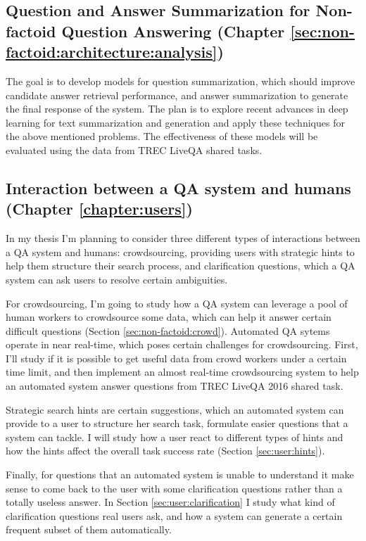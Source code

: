 \subsection{Question and Answer Summarization for Non-factoid Question Answering (Chapter \ref{sec:non-factoid:architecture:analysis})}
\label{sec:plan2}

The goal is to develop models for question summarization, which should improve candidate answer retrieval performance, and answer summarization to generate the final response of the system.
The plan is to explore recent advances in deep learning for text summarization \cite{rush-chopra-weston:2015:EMNLP,chopraabstractive16} and generation \cite{karpathy2015deep} and apply these techniques for the above mentioned problems.
The effectiveness of these models will be evaluated using the data from TREC LiveQA shared tasks.


\subsection{Interaction between a QA system and humans (Chapter \ref{chapter:users})}
\label{sec:plan4}

In my thesis I'm planning to consider three different types of interactions between a QA system and humans: crowdsourcing, providing users with strategic hints to help them structure their search process, and clarification questions, which a QA system can ask users to resolve certain ambiguities.

For crowdsourcing, I'm going to study how a QA system can leverage a pool of human workers to crowdsource some data, which can help it answer certain difficult questions (Section \ref{sec:non-factoid:crowd}).
Automated QA sytems operate in near real-time, which poses certain challenges for crowdsourcing.
First, I'll study if it is possible to get useful data from crowd workers under a certain time limit, and then implement an almost real-time crowdsourcing system to help an automated system answer questions from TREC LiveQA 2016 shared task.

Strategic search hints are certain suggestions, which an automated system can provide to a user to structure her search task, formulate easier questions that a system can tackle.
I will study how a user react to different types of hints and how the hints affect the overall task success rate (Section \ref{sec:user:hints}).

Finally, for questions that an automated system is unable to understand it make sense to come back to the user with some clarification questions rather than a totally useless answer.
In Section \ref{sec:user:clarification} I study what kind of clarification questions real users ask, and how a system can generate a certain frequent subset of them automatically.


